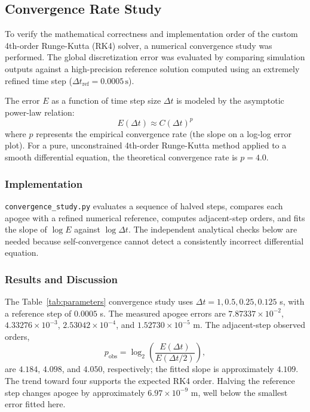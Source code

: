 \documentclass{article}
\begin{document}
\subsection{Convergence Rate Study}%

To verify the mathematical correctness and implementation order of the custom 4th-order Runge-Kutta (RK4) solver, a numerical convergence study was performed. The global discretization error was evaluated by comparing simulation outputs against a high-precision reference solution computed using an extremely refined time step ($\Delta t_{\text{ref}} = 0.0005\,\text{s}$). 

The error $E$ as a function of time step size $\Delta t$ is modeled by the asymptotic power-law relation:
\begin{equation}
    E(\Delta t) \approx C (\Delta t)^p
\end{equation}
where $p$ represents the empirical convergence rate (the slope on a log-log error plot). For a pure, unconstrained 4th-order Runge-Kutta method applied to a smooth differential equation, the theoretical convergence rate is $p = 4.0$.

\subsubsection{Implementation}
\texttt{convergence\_study.py} evaluates a sequence of halved steps, compares each apogee with a refined numerical reference, computes adjacent-step orders, and fits the slope of $\log E$ against $\log\Delta t$. The independent analytical checks below are needed because self-convergence cannot detect a consistently incorrect differential equation.

\subsubsection{Results and Discussion}
The Table~\ref{tab:parameters} convergence study uses $\Delta t=1,0.5,0.25,0.125$ s, with a reference step of $0.0005$ s. The measured apogee errors are $7.87337\times10^{-2}$, $4.33276\times10^{-3}$, $2.53042\times10^{-4}$, and $1.52730\times10^{-5}$ m. The adjacent-step observed orders,
\[
p_{\mathrm{obs}}=\log_2\!\left(\frac{E(\Delta t)}{E(\Delta t/2)}\right),
\]
are $4.184$, $4.098$, and $4.050$, respectively; the fitted slope is approximately $4.109$. The trend toward four supports the expected RK4 order. Halving the reference step changes apogee by approximately $6.97\times10^{-9}$ m, well below the smallest error fitted here.
\end{document}
